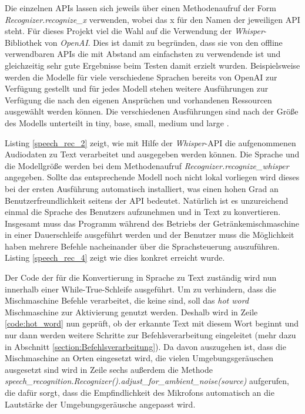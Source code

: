 Die einzelnen \ac{API}s lassen sich jeweils über einen Methodenaufruf der Form \textit{Recognizer.recognize\_x} verwenden, wobei das \glqq{}x\grqq{} für den Namen der jeweiligen \ac{API} steht. Für dieses Projekt viel die Wahl auf die Verwendung der \textit{Whisper}-Bibliothek von \textit{OpenAI}. Dies ist damit zu begründen, dass sie von den offline verwendbaren \ac{API}s die mit Abstand am einfachsten zu verwendende ist und gleichzeitig sehr gute Ergebnisse beim Testen damit erzielt wurden. Beispielsweise werden die Modelle für viele verschiedene Sprachen bereits von OpenAI zur Verfügung gestellt und für jedes Modell stehen weitere Ausführungen zur Verfügung die nach den eigenen Ansprüchen und vorhandenen Ressourcen ausgewählt werden können. Die verschiedenen Ausführungen sind nach der \glqq{}Größe\grqq{} des Modells unterteilt in \glqq{}tiny\grqq{}, \glqq{}base\grqq{}, \glqq{}small\grqq{}, \glqq{}medium\grqq{} und \glqq{}large\grqq{} \cite{whisper_repo}.

Listing \ref{speech_rec_2} zeigt, wie mit Hilfe der \textit{Whisper}-\ac{API} die aufgenommenen Audiodaten zu Text verarbeitet und ausgegeben werden können. Die Sprache und die Modellgröße werden bei dem Methodenaufruf \textit{Recognizer.recognize\_whisper} angegeben. Sollte das entsprechende Modell noch nicht lokal vorliegen wird dieses bei der ersten Ausführung automatisch installiert, was einen hohen Grad an Benutzerfreundlichkeit seitens der \ac{API} bedeutet. Natürlich ist es unzureichend einmal die Sprache des Benutzers aufzunehmen und in Text zu konvertieren. Insgesamt muss das Programm während des Betriebs der Getränkemischmaschine in einer Dauerschleife ausgeführt werden und der Benutzer muss die Möglichkeit haben mehrere Befehle nacheinander über die Sprachsteuerung auszuführen. Listing \ref{speech_rec_4} zeigt wie dies konkret erreicht wurde.
 
Der Code der für die Konvertierung in Sprache zu Text zuständig wird nun innerhalb einer While-True-Schleife ausgeführt. Um zu verhindern, dass die Mischmaschine Befehle verarbeitet, die keine sind, soll das \textit{hot word} \glqq{}Mischmaschine\grqq{} zur Aktivierung genutzt werden. Deshalb wird in Zeile \ref{code:hot_word} nun geprüft, ob der erkannte Text mit diesem Wort beginnt und nur dann werden weitere Schritte zur Befehlsverarbeitung eingeleitet (mehr dazu in Abschnitt \ref{section:Befehlsverarbeitung}). Da davon auszugehen ist, dass die Mischmaschine an Orten eingesetzt wird, die vielen Umgebungsgeräuschen ausgesetzt sind wird in Zeile sechs außerdem die Methode \textit{speech\_recognition.Recognizer().adjust\_for\_ambient\_noise(source)} aufgerufen, die dafür sorgt, dass die Empfindlichkeit des Mikrofons automatisch an die Lautstärke der Umgebungsgeräusche angepasst wird.
